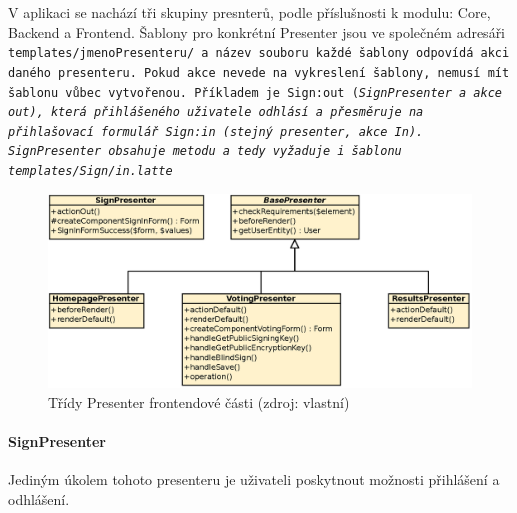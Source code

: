 V aplikaci se nachází tři skupiny presnterů, podle příslušnosti k modulu: Core, Backend a Frontend. Šablony pro konkrétní Presenter jsou ve společném adresáři \tt{templates/jmenoPresenteru/} a název souboru každé šablony odpovídá akci daného presenteru. Pokud akce nevede na vykreslení šablony, nemusí mít šablonu vůbec vytvořenou. Příkladem je \tt{Sign:out} (\it{SignPresenter} a akce \it{out}), která přihlášeného uživatele odhlásí a přesměruje na přihlašovací formulář \tt{Sign:in} (stejný presenter, akce \textit{In}). SignPresenter obsahuje metodu  a tedy vyžaduje i šablonu \tt{templates/Sign/in.latte}



\begin{figure}[h]
	\centering
	\includegraphics[width=\linewidth]{svg/frontendPresenters.eps}
	\captionsetup{width=\linewidth}
	\caption[Třídy Presenter frontendové části]{Třídy Presenter frontendové části (zdroj: vlastní)}
	\label{fig:FrontendPresenters}
\end{figure}
\clearpage
\paragraph{SignPresenter} Jediným úkolem tohoto presenteru je uživateli poskytnout možnosti přihlášení a odhlášení.

